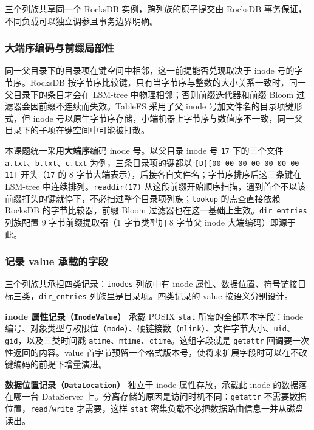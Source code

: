 三个列族共享同一个 RocksDB 实例，跨列族的原子提交由 RocksDB 事务保证，不同负载可以独立调参且事务边界明确。

\subsubsection{大端序编码与前缀局部性}

同一父目录下的目录项在键空间中相邻，这一前提能否兑现取决于 inode 号的字节序。RocksDB 按字节序比较键，只有当字节序与整数的大小关系一致时，同一父目录下的条目才会在 LSM-tree 中物理相邻；否则前缀迭代器和前缀 Bloom 过滤器会因前缀不连续而失效。TableFS\cite{ren2013tablefs} 采用了父 inode 号加文件名的目录项键形式，但 inode 号以原生字节序存储，小端机器上字节序与数值序不一致，同一父目录下的子项在键空间中可能被打散。

本课题统一采用\textbf{大端序}编码 inode 号。以父目录 inode 号 \texttt{17} 下的三个文件 \texttt{a.txt}、\texttt{b.txt}、\texttt{c.txt} 为例，三条目录项的键都以 \texttt{[D][00 00 00 00 00 00 00 11]} 开头（\texttt{17} 的 8 字节大端表示），后接各自文件名；字节序排序后这三条键在 LSM-tree 中连续排列。\texttt{readdir(17)} 从这段前缀开始顺序扫描，遇到首个不以该前缀打头的键就停下，不必扫过整个目录项列族；\texttt{lookup} 的点查直接依赖 RocksDB 的字节比较器，前缀 Bloom 过滤器也在这一基础上生效。\texttt{dir\_entries} 列族配置 9 字节前缀提取器（1 字节类型加 8 字节父 inode 大端编码）即源于此。

\subsubsection{记录 value 承载的字段}

三个列族共承担四类记录：\texttt{inodes} 列族中有 inode 属性、数据位置、符号链接目标三类，\texttt{dir\_entries} 列族里是目录项。四类记录的 value 按语义分别设计。

\textbf{inode 属性记录（\texttt{InodeValue}）} 承载 POSIX \texttt{stat} 所需的全部基本字段：inode 编号、对象类型与权限位（\texttt{mode}）、硬链接数（\texttt{nlink}）、文件字节大小、\texttt{uid}、\texttt{gid}，以及三类时间戳 \texttt{atime}、\texttt{mtime}、\texttt{ctime}。这组字段就是 \texttt{getattr} 回调要一次性返回的内容。value 首字节预留一个格式版本号，使将来扩展字段时可以在不改键编码的前提下增量演进。

\textbf{数据位置记录（\texttt{DataLocation}）} 独立于 inode 属性存放，承载此 inode 的数据落在哪一台 DataServer 上。分离存储的原因是访问时机不同：\texttt{getattr} 不需要数据位置，\texttt{read}/\texttt{write} 才需要，这样 \texttt{stat} 密集负载不必把数据路由信息一并从磁盘读出。

